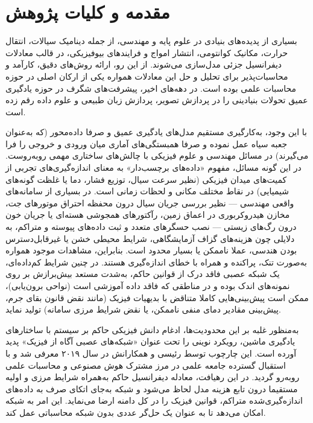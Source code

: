 \chapter{مقدمه و کلیات پژوهش}
\label{ch:intro}

بسیاری از پدیده‌های بنیادی در علوم پایه و مهندسی، از جمله دینامیک سیالات، انتقال حرارت، مکانیک کوانتومی، انتشار امواج و فرایندهای بیوفیزیکی، در قالب معادلات دیفرانسیل جزئی مدل‌سازی می‌شوند. از این رو، ارائه روش‌های دقیق، کارآمد و محاسبات‌پذیر برای تحلیل و حل این معادلات همواره یکی از ارکان اصلی در حوزه محاسبات علمی بوده است. در دهه‌های اخیر، پیشرفت‌های شگرف در حوزه یادگیری عمیق تحولات بنیادینی را در پردازش تصویر، پردازش زبان طبیعی و علوم داده رقم زده است.

با این وجود، به‌کارگیری مستقیم مدل‌های یادگیری عمیق و صرفا داده‌محور (که به‌عنوان جعبه سیاه عمل نموده و صرفا همبستگی‌های آماری میان ورودی و خروجی را فرا می‌گیرند) در مسائل مهندسی و علوم فیزیکی با چالش‌های ساختاری مهمی روبه‌روست. در این گونه مسائل، مفهوم «داده‌های برچسب‌دار» به معنای اندازه‌گیری‌های تجربی از کمیت‌های میدان فیزیکی (نظیر سرعت سیال، توزیع فشار، دما یا غلظت گونه‌های شیمیایی) در نقاط مختلف مکانی و لحظات زمانی است. در بسیاری از سامانه‌های واقعی مهندسی — نظیر بررسی جریان سیال درون محفظه احتراق موتورهای جت، مخازن هیدروکربوری در اعماق زمین، رآکتورهای همجوشی هسته‌ای یا جریان خون درون رگ‌های زیستی — نصب حسگرهای متعدد و ثبت داده‌های پیوسته و متراکم، به دلایلی چون هزینه‌های گزاف آزمایشگاهی، شرایط محیطی خشن یا غیرقابل‌دسترس بودن هندسی، عملا ناممکن یا بسیار محدود است. بنابراین، مشاهدات موجود همواره به‌صورت تنک، پراکنده و همراه با خطای اندازه‌گیری هستند. در چنین شرایط کم‌داده‌ای، یک شبکه عصبی فاقد درک از قوانین حاکم، به‌شدت مستعد بیش‌برازش بر روی نمونه‌های اندک بوده و در مناطقی که فاقد داده آموزشی است (نواحی برون‌یابی)، ممکن است پیش‌بینی‌هایی کاملا متناقض با بدیهیات فیزیک (مانند نقض قانون بقای جرم، پیش‌بینی مقادیر دمای منفی ناممکن، یا نقض شرایط مرزی سامانه) تولید نماید.

به‌منظور غلبه بر این محدودیت‌ها، ادغام دانش فیزیکی حاکم بر سیستم با ساختارهای یادگیری ماشین، رویکرد نوینی را تحت عنوان «شبکه‌های عصبی آگاه از فیزیک» پدید آورده است. این چارچوب توسط رئیسی و همکارانش در سال ۲۰۱۹ معرفی شد \cite{raissi2019} و با استقبال گسترده جامعه علمی در مرز مشترک هوش مصنوعی و محاسبات علمی روبه‌رو گردید. در این رهیافت، معادله دیفرانسیل حاکم به‌همراه شرایط مرزی و اولیه مستقیما درون تابع هزینه مدل لحاظ می‌شود و شبکه به‌جای اتکای صرف به داده‌های اندازه‌گیری‌شده متراکم، قوانین فیزیک را در کل دامنه ارضا می‌نماید. این امر به شبکه امکان می‌دهد تا به عنوان یک حل‌گر عددی بدون شبکه محاسباتی عمل کند.

